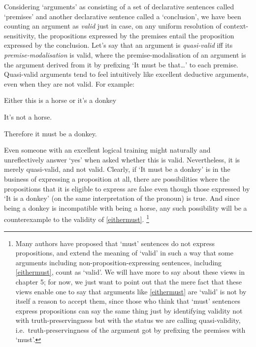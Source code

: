 \documentclass[If.tex]{subfiles}
\begin{document}
Considering ‘arguments’ as consisting of a set of declarative sentences called ‘premises’ and another declarative sentence called a ‘conclusion’, we have been counting an argument as \emph{valid} just in case, on any uniform resolution of context-sensitivity, the propositions expressed by the premises entail the proposition expressed by the conclusion.  Let's say that an argument is \emph{quasi-valid} iff its \emph{premise-modalisation} is valid, where the premise-modalisation of an argument is the argument derived from it by prefixing ‘It must be that\ldots{}’ to each premise.  Quasi-valid arguments tend to feel intuitively like excellent deductive arguments, even when they are not valid. For example:
\begin{prop}
	\nitem \label{eithermust}
		Either this is a horse or it's a donkey

		It's not a horse.

		Therefore it must be a donkey.
\end{prop}
Even someone with an excellent logical training might naturally and unreflectively answer ‘yes’ when asked whether this is valid.  Nevertheless, it is merely quasi-valid, and not valid.  Clearly, if ‘It must be a donkey’ is in the business of expressing a proposition at all, there are possibilities where the propositions that it is eligible to express are false even though those expressed by ‘It is a donkey’ (on the same interpretation of the pronoun) is true.  And since being a donkey is incompatible with being a horse, any such possibility will be a counterexample to the validity of \ref{eithermust}.%
\footnote{Many authors have proposed that ‘must’ sentences do not express propositions, and extend the meaning of ‘valid’ in such a way that some arguments including non-proposition-expressing sentences, including \ref{eithermust}, count as ‘valid’.  We will have more to say about these views in chapter 5; for now, we just want to point out that the mere fact that these views enable one to say that arguments like \ref{eithermust} are ‘valid’ is not by itself a reason to accept them, since those who think that ‘must’ sentences express propositions can say the same thing just by identifying validity not with truth-preservingness but with the status we are calling quasi-validity, i.e.\ truth-preservingness of the argument got by prefixing the premises with ‘must’.}
\end{document}
